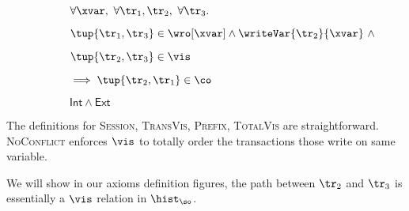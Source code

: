\begin{figure}
 \begin{subfigure}[t]{.3\textwidth}
  \centering
  \parbox{\textwidth}{
   $\forall \xvar,\ \forall \tr_1,\tr_2,\ \forall \tr_3.$
   
   \hspace{4mm}$\tup{\tr_1,\tr_3}\in \wro[\xvar] \land \writeVar{\tr_2}{\xvar}\ \land$ 
   
   \hspace{9mm}$\tup{\tr_2,\tr_3}\in\vis$
   
   \hspace{14mm}$\implies \tup{\tr_2,\tr_1}\in\co$
  }
  
  \caption{$\mathsf{Int} \land \mathsf{Ext}$}
  \label{ext_fig}
 \end{subfigure}
 \caption{}
 \label{}
\end{figure}

The definitions for \textsc{Session}, \textsc{TransVis}, \textsc{Prefix}, \textsc{TotalVis} are straightforward. \textsc{NoConflict} enforces $\vis$ to totally order the transactions those write on same variable.

We will show in our axioms definition figures, the path between $\tr_2$ and $\tr_3$ is essentially a $\vis$ relation in $\hist_{\so}$.


